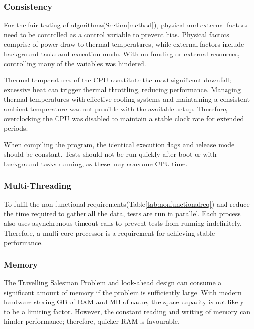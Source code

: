 \subsubsection{Consistency}

For the fair testing of algorithms(Section\ref{method}), physical and external factors need to be controlled as a control variable to prevent bias. Physical factors comprise of power draw to thermal temperatures, while external factors include background tasks and execution mode. With no funding or external resources, controlling many of the variables was hindered.

Thermal temperatures of the CPU constitute the most significant downfall; excessive heat can trigger thermal throttling, reducing performance. Managing thermal temperatures with effective cooling systems and maintaining a consistent ambient temperature was not possible with the available setup. Therefore, overclocking the CPU was disabled to maintain a stable clock rate for extended periods.

When compiling the program, the identical execution flags and release mode should be constant. Tests should not be run quickly after boot or with background tasks running, as these may consume CPU time.

\subsubsection{Multi-Threading}

To fulfil the non-functional requirements(Table\ref{tab:nonfunctionalreq}) and reduce the time required to gather all the data, tests are run in parallel. Each process also uses asynchronous timeout calls to prevent tests from running indefinitely. Therefore, a multi-core processor is a requirement for achieving stable performance.

\subsubsection{Memory}

The Travelling Salesman Problem and look-ahead design can consume a significant amount of memory if the problem is sufficiently large. With modern hardware storing GB of RAM and MB of cache, the space capacity is not likely to be a limiting factor. However, the constant reading and writing of memory can hinder performance; therefore, quicker RAM is favourable.
